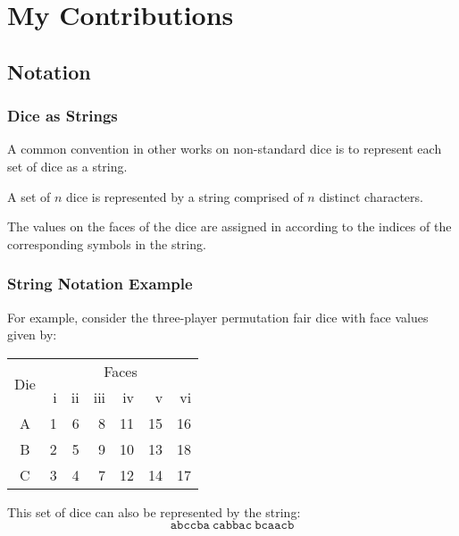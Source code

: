 \documentclass[aspectratio=169]{beamer}
\begin{document}
\section{My Contributions}
\begin{frame}[Triangle=siiorange]
	\tocpage
\end{frame}


\subsection{Notation}
\begin{frame}[triangle=siiblue]
\frametitle{Dice as Strings}
A common convention in other works on non-standard dice is to represent each set of dice as a string.

\vfill

A set of $n$ dice is represented by a string comprised of $n$ distinct characters.  

\vfill

The values on the faces of the dice are assigned in according to the indices of the corresponding symbols in the string.
\end{frame}

\begin{frame}[triangle=siiblue]
\frametitle{String Notation Example}
For example, consider the three-player permutation fair dice with face values given by:
\begin{table}
\begin{tabular}{c rrrrrr} \toprule
\multirow{2}[2]{*}{Die} &  \multicolumn{6}{c}{Faces} \\ \cmidrule(lr){2-7}     
   & i & ii & iii & iv & v & vi \\ \midrule
A & 1 & 6 & 8 & 11 & 15 & 16 \\
B & 2 & 5 &  9 & 10 & 13 & 18 \\
C & 3 & 4 & 7 & 12 & 14 & 17 \\ \bottomrule
\end{tabular}
\end{table}

\vfill

This set of dice can also be represented by the string:
\begin{equation*}
		\texttt{abccba} \ \texttt{cabbac} \ \texttt{bcaacb}
\end{equation*}
\end{frame}
\end{document}
